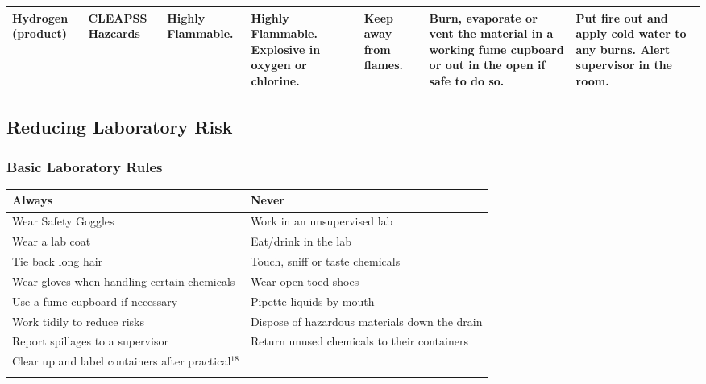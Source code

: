 \begin{landscape}
\begin{center}
\begin{longtable}{|p{1.5cm}|p{1.5cm}|p{3cm}|p{3cm}|p{3cm}|p{3cm}|p{2cm}|}
\\ \hline

Hydrogen (product) &
CLEAPSS Hazcards
& Highly Flammable.
& Highly Flammable. Explosive in oxygen or chlorine. 
& Keep away from flames.
& Burn, evaporate or vent the material in a working fume cupboard or out in the open if safe to do so.
& Put fire out and apply cold water to any burns. Alert supervisor in the room.

\\ \hline



\end{longtable}
\label{tab:Risk Assessment Table}

\end{center}

\end{landscape}




\subsection{Reducing Laboratory Risk}

\subsubsection{Basic Laboratory Rules}
\begin{center}

\begin{tabular}{|l|l|}
    \hline
    \textbf{Always} & \textbf{Never} \\ \hline
Wear Safety Goggles & Work in an unsupervised lab \\ \hline
Wear a lab coat & Eat/drink in the lab \\ \hline
Tie back long hair & Touch, sniff or taste chemicals \\ \hline
Wear gloves when handling certain chemicals & Wear open toed shoes \\ \hline
Use a fume cupboard if necessary & Pipette liquids by mouth \\ \hline
Work tidily to reduce risks & Dispose of hazardous materials down the drain \\ \hline
Report spillages to a supervisor & Return unused chemicals to their containers \\ \hline
Clear up and label containers after practical$^{18}$ & \\ \hline
\label{tab:BasicLabRules}
\end{tabular}
\end{center}

